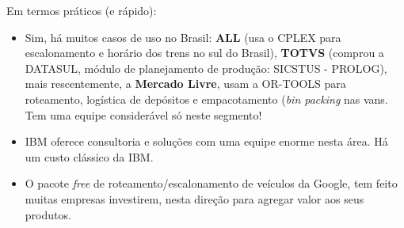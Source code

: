 \documentclass{beamer}
\begin{document}
\begin{frame}[fragile]


   \begin{block}{Em termos práticos (e rápido):}
     \begin{itemize}
        \item Sim, há muitos casos de uso no Brasil: {\bf ALL} (usa o CPLEX para escalonamento e horário dos trens no sul do Brasil), {\bf TOTVS} (comprou a DATASUL, módulo de planejamento de produção: SICSTUS - PROLOG), mais rescentemente, a {\bf Mercado Livre}, usam a OR-TOOLS para roteamento, logística de depósitos e empacotamento ({\em bin packing} nas vans. Tem uma equipe considerável só neste segmento!
        
        \item IBM oferece consultoria e soluções com uma equipe enorme nesta área. Há um custo clássico da IBM.
        
        \item O pacote {\em free} de roteamento/escalonamento de veículos da Google, tem feito muitas empresas investirem, nesta direção para agregar valor aos seus  produtos. 

    \end{itemize}
    
\end{block}
    
\end{frame}


\end{document}
